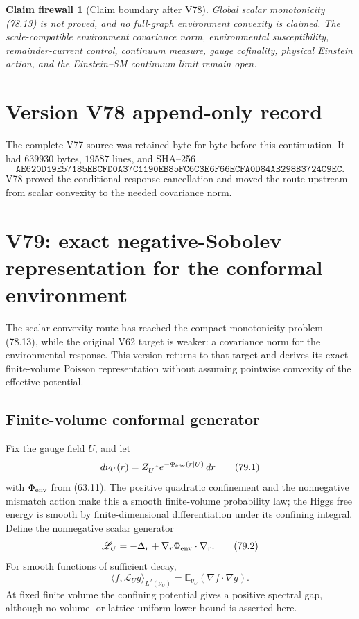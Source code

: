 \documentclass[11pt]{article}
\newtheorem{firewall}[theorem]{Claim firewall}
\theoremstyle{remark}
\begin{document}
\begin{firewall}[Claim boundary after V78]
\label{fire:v17v78}
Global scalar monotonicity (78.13) is not proved, and no full-graph
environment convexity is claimed.  The scale-compatible environment
covariance norm, environmental susceptibility, remainder-current
control, continuum measure, gauge cofinality, physical Einstein action,
and the Einstein--SM continuum limit remain open.
\end{firewall}

\section*{Version V78 append-only record}
The complete V77 source was retained byte for byte before this
continuation.  It had \(639930\) bytes, \(19587\) lines, and SHA--256
\[
 \texttt{AE620D19E57185EBCFD0A37C1190EB85FC6C3E6F66ECFA0D84AB298B3724C9EC}.
\]
V78 proved the conditional-response cancellation and moved the route
upstream from scalar convexity to the needed covariance norm.


\section{V79: exact negative-Sobolev representation for the conformal environment}
\label{sec:v17v79}

The scalar convexity route has reached the compact monotonicity problem
(78.13), while the original V62 target is weaker: a covariance norm
for the environmental response.  This version returns to that target
and derives its exact finite-volume Poisson representation without
assuming pointwise convexity of the effective potential.

\subsection{Finite-volume conformal generator}

Fix the gauge field \(U\), and let
\[
 d\nu_U(r)=Z_U^{-1}e^{-\Phi_{\rm env}(r\mid U)}\,dr              \tag{79.1}
\]
with \(\Phi_{\rm env}\) from (63.11).  The positive quadratic
confinement and the nonnegative mismatch action make this a smooth
finite-volume probability law; the Higgs free energy is smooth by
finite-dimensional differentiation under its confining integral.
Define the nonnegative scalar generator
\[
 \mathscr L_U=-\Delta_r+
 \nabla_r\Phi_{\rm env}\cdot\nabla_r.             \tag{79.2}
\]
For smooth functions of sufficient decay,
\[
 \langle f,\mathscr L_Ug\rangle_{L^2(\nu_U)}
 =\mathbb E_{\nu_U}(\nabla f\cdot\nabla g).        \tag{79.3}
\]
At fixed finite volume the confining potential gives a positive
spectral gap, although no volume- or lattice-uniform lower bound is
asserted here.
\end{document}
